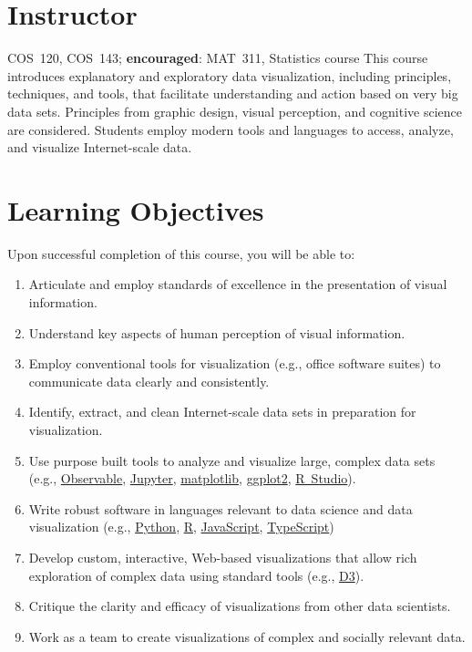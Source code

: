 \documentclass[11pt]{article}
\begin{document}


\section{Instructor}



\begin{catalogentry}{COS~120, COS~143; \textbf{encouraged}: MAT~311, Statistics course}
  This course introduces explanatory and exploratory data visualization,
  including principles, techniques, and tools,
  that facilitate understanding and action based on very big data sets.
  Principles from graphic design,
  visual perception,
  and cognitive science are considered.
  Students employ modern tools and languages to access, analyze, and visualize
  Internet-scale data.
\end{catalogentry}

\section{Learning Objectives}

Upon successful completion of this course,
you will be able to:
\begin{enumerate}
\item Articulate and employ standards of excellence in
  the presentation of visual information.
\item Understand key aspects of human perception of visual information.
\item Employ conventional tools for visualization (e.g., office software suites)
  to communicate data clearly and consistently.
\item Identify, extract, and clean Internet-scale data sets in preparation
  for visualization.
\item Use purpose built tools to analyze and visualize large, complex
  data sets (e.g.,
  \href{https://observablehq.com/}{Observable},
  \href{https://jupyter.org/}{Jupyter},
  \href{https://matplotlib.org/}{matplotlib},
  \href{https://ggplot2.tidyverse.org/}{ggplot2},
  \href{https://rstudio.com/products/rstudio/}{R~Studio}).
\item Write robust software in languages relevant to
  data science and data visualization (e.g.,
  \href{https://www.python.org/}{Python},
  \href{https://www.r-project.org/}{R},
  \href{https://developer.mozilla.org/en-US/docs/Web/JavaScript}{JavaScript},
  \href{https://www.typescriptlang.org/}{TypeScript})
\item Develop custom, interactive, Web-based visualizations
  that allow rich exploration of complex data using
  standard tools (e.g., \href{https://d3js.org/}{D3}).
\item Critique the clarity and efficacy of visualizations from other data scientists.
\item Work as a team to create visualizations of complex and socially relevant data.
\end{enumerate}
\end{document}
